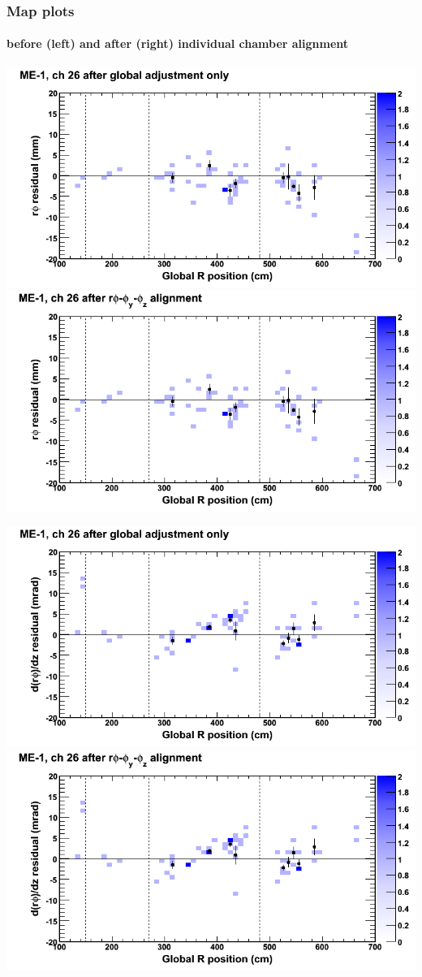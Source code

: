 \documentclass[compress]{beamer}
\begin{document}
\begin{frame}
\frametitle{Map plots}
\framesubtitle{before (left) and after (right) individual chamber alignment}
\includegraphics[width=0.5\linewidth]{ringmapplots_3dof/before_CSCvsr_mem1ch26_x.png} \includegraphics[width=0.5\linewidth]{ringmapplots_3dof/after_CSCvsr_mem1ch26_x.png}

\includegraphics[width=0.5\linewidth]{ringmapplots_3dof/before_CSCvsr_mem1ch26_dxdz.png} \includegraphics[width=0.5\linewidth]{ringmapplots_3dof/after_CSCvsr_mem1ch26_dxdz.png}
\end{frame}
\end{document}
